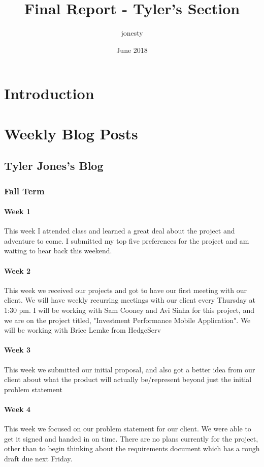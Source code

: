\documentclass{article}
\title{Final Report - Tyler's Section}
\author{jonesty }
\date{June 2018}
\begin{document}
\maketitle

\section{Introduction}
\section{Weekly Blog Posts}
\subsection{Tyler Jones's Blog}
\subsubsection{Fall Term}
\paragraph{Week 1}
This week I attended class and learned a great deal about the project and adventure to come. I submitted my top five preferences for the project and am waiting to hear back this weekend.
\paragraph{Week 2}
This week we received our projects and got to have our first meeting with our client. We will have weekly recurring meetings with our client every Thursday at 1:30 pm. I will be working with Sam Cooney and Avi Sinha for this project, and we are on the project titled, "Investment Performance Mobile Application". We will be working with Brice Lemke from HedgeServ
\paragraph{Week 3}
This week we submitted our initial proposal, and also got a better idea from our client about what the product will actually be/represent beyond just the initial problem statement 
\paragraph{Week 4}
This week we focused on our problem statement for our client. We were able to get it signed and handed in on time. There are no plans currently for the project, other than to begin thinking about the requirements document which has a rough draft due next Friday. 
\end{document}
